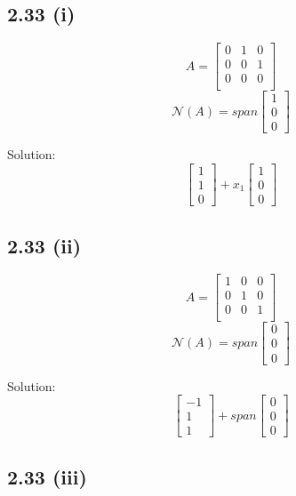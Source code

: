 \documentclass[letterpaper,12pt]{article}
\theoremstyle{definition}
\begin{document}
\subsection*{2.33 (i)}

\[A =
\begin{bmatrix}
    0 & 1 & 0 \\
    0 & 0 & 1 \\
    0 & 0 & 0 \\
\end{bmatrix}
\]
\[ \mathscr{N} (A) = span 
\begin{bmatrix}
    1 \\
    0\\
    0
\end{bmatrix}
\]

Solution:
\[
\begin{bmatrix}
    1\\1\\0
\end{bmatrix}
+
x_1
\begin{bmatrix}
    1\\0\\0
\end{bmatrix}
\]

\subsection*{2.33 (ii)}

\[A =
\begin{bmatrix}
    1 & 0 & 0 \\
    0 & 1 & 0 \\
    0 & 0 & 1 \\
\end{bmatrix}
\]
\[ \mathscr{N} (A) = span 
\begin{bmatrix}
    0 \\
    0\\
    0
\end{bmatrix}
\]

Solution:
\[
\begin{bmatrix}
    -1\\1\\1
\end{bmatrix}
+
span
\begin{bmatrix}
    0\\0\\0
\end{bmatrix}
\]

\subsection*{2.33 (iii)}
\end{document}
